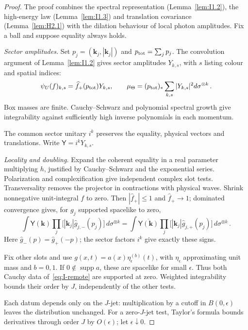 \begin{proof}
The proof combines the spectral representation (Lemma~\ref{lem:I1.2}), the high-energy law (Lemma~\ref{lem:I1.3}) and translation covariance (Lemma~\ref{lem:H2.1}) with the dilation behaviour of local photon amplitudes. Fix a ball and suppose equality always holds.

\emph{Sector amplitudes.} Set $p_j=(\mathbf k_j,|\mathbf k_j|)$ and $p_{\rm tot}=\sum_jp_j$. The convolution argument of Lemma~\ref{lem:I1.2} gives sector amplitudes $Y_{k,s}$, with $s$ listing colour and spatial indices:
\begin{equation}\label{eq:I-sector}
\psi_U(f)_{k,s}=\widehat f_+(p_{\rm tot})Y_{k,s},\qquad
\mu_{\Theta}=(p_{\rm tot})_*\sum_{k,s}|Y_{k,s}|^2d\sigma^{\otimes k}\,.
\end{equation}
Box masses are finite. Cauchy--Schwarz and polynomial spectral growth give integrability against sufficiently high inverse polynomials in each momentum.

The common sector unitary $i^k$ preserves the equality, physical vectors and translations. Write $\mathsf Y=i^kY_{k,s}$.

\emph{Locality and doubling.} Expand the coherent equality in a real parameter multiplying $h$, justified by Cauchy--Schwarz and the exponential series. Polarization and complexification give independent complex slot tests. Transversality removes the projector in contractions with physical waves. Shrink nonnegative unit-integral $f$ to zero. Then $|\widehat f_+|\le1$ and $\widehat f_+\to1$; dominated convergence gives, for $g_j$ supported spacelike to zero,
\begin{equation}\label{eq:I-remote}
\int \mathsf Y(\boldsymbol k)\prod_j\big[|\mathbf k_j|\widehat g_{j,-}(p_j)\big]\,d\sigma^{\otimes k}
=\int\overline{\mathsf Y(\boldsymbol k)}\prod_j\big[|\mathbf k_j|\widehat g_{j,+}(p_j)\big]\,d\sigma^{\otimes k}\,.
\end{equation}
Here $\widehat g_-(p)=\widehat g_+(-p)$; the sector factors $i^k$ give exactly these signs.

Fix other slots and use $g(x,t)=a(x)\eta_\epsilon^{(b)}(t)$, with $\eta_\epsilon$ approximating unit mass and $b=0,1$. If $0\notin\operatorname{supp}a$, these are spacelike for small $\epsilon$. Thus both Cauchy data of~\eqref{eq:I-remote} are supported at zero. Weighted integrability bounds their order by $J$, independently of the other tests.

Each datum depends only on the $J$-jet: multiplication by a cutoff in $B(0,\epsilon)$ leaves the distribution unchanged. For a zero-$J$-jet test, Taylor's formula bounds derivatives through order $J$ by $O(\epsilon)$; let $\epsilon\downarrow0$.


\end{proof}
